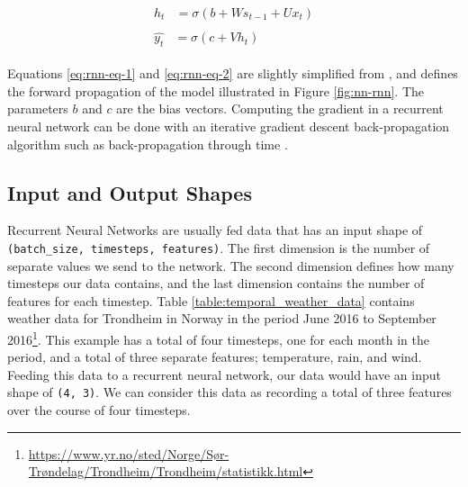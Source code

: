 \begin{align}
    \begin{split}\label{eq:rnn-eq-1}
        h_{t}&=\sigma(b+Ws_{t-1}+Ux_{t})
    \end{split}\\
    \begin{split}\label{eq:rnn-eq-2}
        \hat{y_{t}}&=\sigma(c+Vh_{t})
    \end{split}
\end{align}

Equations \ref{eq:rnn-eq-1} and \ref{eq:rnn-eq-2} are slightly simplified from \citep{goodfellow2016deeplearning}, and defines the forward propagation of the model illustrated in Figure \ref{fig:nn-rnn}. The parameters \(b\) and \(c\) are the bias vectors. Computing the gradient in a recurrent neural network can be done with an iterative gradient descent back-propagation algorithm such as back-propagation through time \citep{werbos1990backpropagation}. 

\subsection{Input and Output Shapes}
\label{sec:input_and_output_shapes}
Recurrent Neural Networks are usually fed data that has an input shape of {\tt (batch\_size, timesteps, features)}. The first dimension is the number of separate values we send to the network. The second dimension defines how many timesteps our data contains, and the last dimension contains the number of features for each timestep. Table \ref{table:temporal_weather_data} contains weather data for Trondheim in Norway in the period June 2016 to September 2016\footnote{\url{https://www.yr.no/sted/Norge/Sør-Trøndelag/Trondheim/Trondheim/statistikk.html}}. This example has a total of four timesteps, one for each month in the period, and a total of three separate features; temperature, rain, and wind. Feeding this data to a recurrent neural network, our data would have an input shape of {\tt (4, 3)}. We can consider this data as recording a total of three features over the course of four timesteps.

